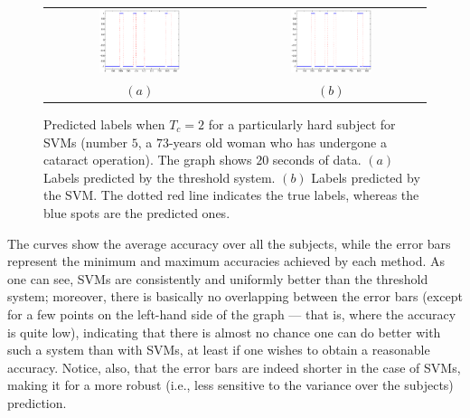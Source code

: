 \documentclass{article}
\begin{document}
\begin{figure}[!t]
  \centering
    \begin{tabular}{cc}
      \includegraphics[width=0.45\textwidth]{predictionT.eps} &
      \includegraphics[width=0.45\textwidth]{predictionS.eps} \\
      $(a)$ & $(b)$
    \end{tabular}
    \caption{Predicted labels when $T_c=2$ for a particularly hard
    subject for SVMs (number $5$, a $73$-years old woman who has
    undergone a cataract operation). The graph shows $20$ seconds of
    data. $(a)$ Labels predicted by the threshold system. $(b)$
    Labels predicted by the SVM. The dotted red line indicates the
    true labels, whereas the blue spots are the predicted ones.}
    \label{fig:prediction}
\end{figure}

The curves show the average accuracy over all the subjects, while the
error bars represent the minimum and maximum accuracies achieved by
each method. As one can see, SVMs are consistently and uniformly
better than the threshold system; moreover, there is basically no
overlapping between the error bars (except for a few points on the
left-hand side of the graph --- that is, where the accuracy is quite
low), indicating that there is almost no chance one can do better with
such a system than with SVMs, at least if one wishes to obtain a
reasonable accuracy. Notice, also, that the error bars are indeed
shorter in the case of SVMs, making it for a more robust (i.e., less
sensitive to the variance over the subjects) prediction.
\end{document}
